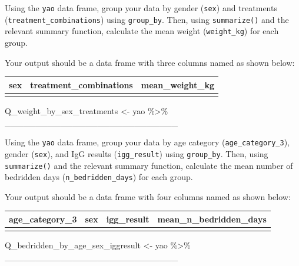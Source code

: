 \documentclass[
  letterpaper,
  DIV=11,
  numbers=noendperiod]{scrreprt}
\newenvironment{Shaded}{\begin{snugshade}}{\end{snugshade}}
\newcommand{\NormalTok}[1]{\textcolor[rgb]{0.00,0.23,0.31}{#1}}
\newcommand{\OtherTok}[1]{\textcolor[rgb]{0.00,0.23,0.31}{#1}}
\newcommand{\SpecialCharTok}[1]{\textcolor[rgb]{0.37,0.37,0.37}{#1}}
\begin{document}
\begin{tcolorbox}[enhanced jigsaw, title=\textcolor{quarto-callout-tip-color}{\faLightbulb}\hspace{0.5em}{Practice}, colbacktitle=quarto-callout-tip-color!10!white, leftrule=.75mm, arc=.35mm, opacityback=0, bottomrule=.15mm, rightrule=.15mm, toptitle=1mm, breakable, toprule=.15mm, colback=white, coltitle=black, colframe=quarto-callout-tip-color-frame, bottomtitle=1mm, titlerule=0mm, left=2mm, opacitybacktitle=0.6]

Using the \texttt{yao} data frame, group your data by gender
(\texttt{sex}) and treatments (\texttt{treatment\_combinations}) using
\texttt{group\_by}. Then, using \texttt{summarize()} and the relevant
summary function, calculate the mean weight (\texttt{weight\_kg}) for
each group.

Your output should be a data frame with three columns named as shown
below:

\begin{longtable}[]{@{}lll@{}}
\toprule\noalign{}
sex & treatment\_combinations & mean\_weight\_kg \\
\midrule\noalign{}
\endhead
\bottomrule\noalign{}
\endlastfoot
& & \\
\end{longtable}

\begin{Shaded}
\begin{Highlighting}[]
\NormalTok{Q\_weight\_by\_sex\_treatments }\OtherTok{\textless{}{-}} 
\NormalTok{  yao }\SpecialCharTok{\%\textgreater{}\%}
\NormalTok{  \_\_\_\_\_\_\_\_\_\_\_\_\_\_\_\_\_\_\_\_\_\_\_\_\_\_\_\_}
\end{Highlighting}
\end{Shaded}

Using the \texttt{yao} data frame, group your data by age category
(\texttt{age\_category\_3}), gender (\texttt{sex}), and IgG results
(\texttt{igg\_result}) using \texttt{group\_by}. Then, using
\texttt{summarize()} and the relevant summary function, calculate the
mean number of bedridden days (\texttt{n\_bedridden\_days}) for each
group.

Your output should be a data frame with four columns named as shown
below:

\begin{longtable}[]{@{}llll@{}}
\toprule\noalign{}
age\_category\_3 & sex & igg\_result & mean\_n\_bedridden\_days \\
\midrule\noalign{}
\endhead
\bottomrule\noalign{}
\endlastfoot
& & & \\
\end{longtable}

\begin{Shaded}
\begin{Highlighting}[]
\NormalTok{Q\_bedridden\_by\_age\_sex\_iggresult }\OtherTok{\textless{}{-}} 
\NormalTok{  yao }\SpecialCharTok{\%\textgreater{}\%}
\NormalTok{  \_\_\_\_\_\_\_\_\_\_\_\_\_\_\_\_\_\_\_\_\_\_\_\_\_\_\_\_}
\end{Highlighting}
\end{Shaded}

\end{tcolorbox}
\end{document}
